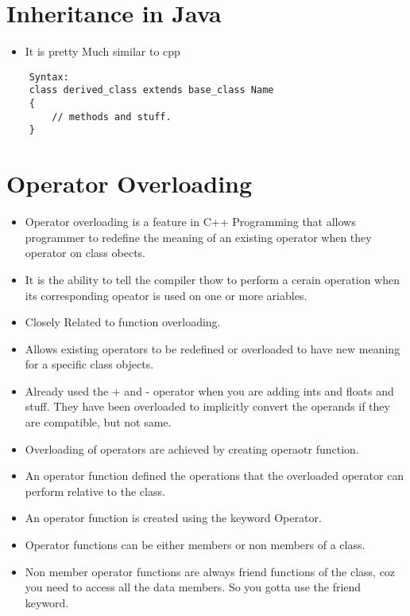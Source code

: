 \documentclass[11pt]{article}
\begin{document}


\section{Inheritance in Java}
\begin{itemize}
	\item It is pretty Much similar to cpp
\end{itemize}

\begin{verbatim}
	Syntax: 
	class derived_class extends base_class Name
	{
		// methods and stuff. 
	}
\end{verbatim}


\section{Operator Overloading}

\begin{itemize}
	\item Operator overloading is a feature in C++ Programming that allows programmer to redefine the meaning of an existing operator when they operator on class obects. 
	\item It is the ability to tell the compiler thow to perform a cerain operation when its corresponding opeator is used on one or more ariables.
	\item Closely Related to function overloading. 
	\item Allows existing operators to be redefined or overloaded to have new meaning for a specific class objects. 
	\item Already used the + and - operator when you are adding ints and floats and stuff. They have been overloaded to implicitly convert the operands if they are compatible, but not same. 
	\item Overloading of operators are achieved by creating operaotr function. 
	\item An operator function defined the operations that the overloaded operator can perform relative to the class. 
	\item An operator function is created using the keyword Operator. 
	\item Operator functions can be either members or non members of a class. 
	\item Non member operator functions are always friend functions of the class, coz you need to access all the data members. So you gotta use the friend keyword.  
\end{itemize}
\end{document}
